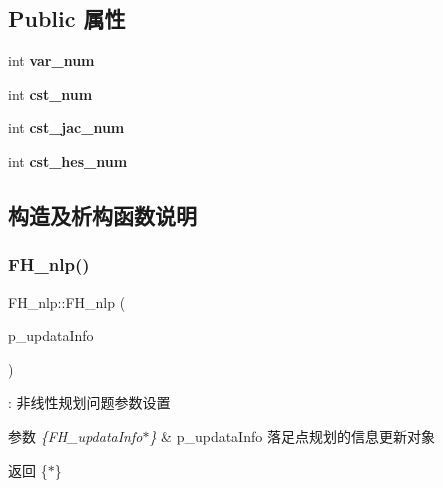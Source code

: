 \subsection*{Public 属性}
\begin{DoxyCompactItemize}
\item 
\mbox{\label{classquadruped_1_1FH__nlp_a4344579b63950206ce985d234a3266fd}} 
int {\bfseries var\+\_\+num}
\item 
\mbox{\label{classquadruped_1_1FH__nlp_abb85add767802a38175db2a34323cae3}} 
int {\bfseries cst\+\_\+num}
\item 
\mbox{\label{classquadruped_1_1FH__nlp_a975ab9034fd3d5cb9c22d7afbd6929cf}} 
int {\bfseries cst\+\_\+jac\+\_\+num}
\item 
\mbox{\label{classquadruped_1_1FH__nlp_a9a73d743c633605649b0664ab7a8a488}} 
int {\bfseries cst\+\_\+hes\+\_\+num}
\end{DoxyCompactItemize}


\subsection{构造及析构函数说明}
\mbox{\label{classquadruped_1_1FH__nlp_a2681be275f98fa7ca224ac7d03cf822e}} 
\subsubsection{\texorpdfstring{F\+H\+\_\+nlp()}{FH\_nlp()}}
{\footnotesize\ttfamily F\+H\+\_\+nlp\+::\+F\+H\+\_\+nlp (\begin{DoxyParamCaption}\item[{\hyperlink{classquadruped_1_1FH__updataInfo}{F\+H\+\_\+updata\+Info} $\ast$}]{p\+\_\+updata\+Info }\end{DoxyParamCaption})\hspace{0.3cm}{\ttfamily [explicit]}}

\+: 非线性规划问题参数设置 
\begin{DoxyParams}{参数}
{\em \{\+F\+H\+\_\+updata\+Info$\ast$\}} & p\+\_\+updata\+Info 落足点规划的信息更新对象 \\
\hline
\end{DoxyParams}
\begin{DoxyReturn}{返回}
\{$\ast$\} 
\end{DoxyReturn}


